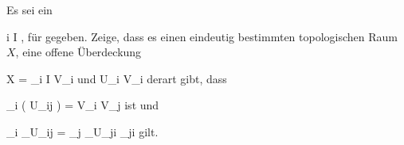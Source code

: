 {

Es sei ein

 {}
 {i \in I} {}
 {} {} {} {,}
für
gegeben. Zeige, dass es einen eindeutig bestimmten topologischen Raum $X$, eine offene Überdeckung

\mavergleichskette
{\vergleichskette
{ X
}
{ = }{ \bigcup_{i \in I} V_i
}
{  }{
}
{    }{
}
{   }{
}
}
{}{}{}
und
 {U_i } { V_i
} {}
derart gibt, dass

\mavergleichskettedisp
{\vergleichskette
{ \psi_i  \left(  U_{ij}  \right)
}
{ =} { V_i \cap V_j
}
{ } {
}
{ } {
}
{ } {
}
}
{}{}{}
ist und

\mavergleichskettedisp
{\vergleichskette
{ \psi_i \vert_{U_{ij} }
}
{ =} { \psi_j \vert_{U_{ji} }  \circ   \varphi_{ji}
}
{ } {
}
{ } {
}
{ } {
}
}
{}{}{}
gilt.

}
